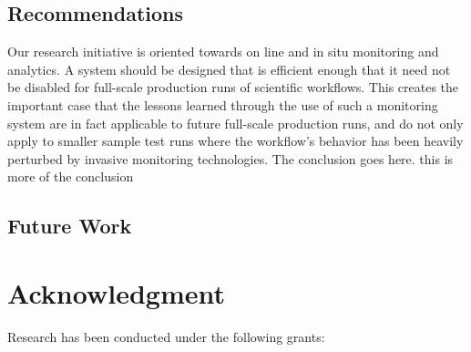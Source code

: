 \subsection{Recommendations}
Our research initiative is oriented towards on line and in 
situ monitoring and  analytics. A system should be designed that is efficient 
enough that it need not 
be disabled for full-scale production runs of scientific workflows. This creates 
the important case that the lessons learned through the use of such a 
monitoring system are in fact applicable to future full-scale production runs, 
and do not only apply to smaller sample test runs where the workflow's behavior 
has been heavily perturbed by invasive monitoring technologies.
The conclusion goes here. this is more of the conclusion
\subsection{Future Work}

\section*{Acknowledgment}
Research has been conducted under the following grants:\\





